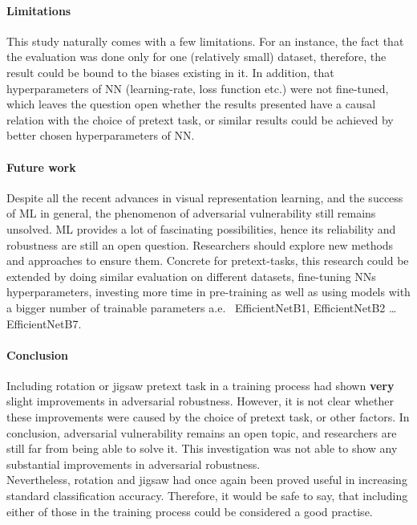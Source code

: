 \paragraph{Limitations}This study naturally comes with a few limitations.
For an instance, the fact that the evaluation was done only for one (relatively small) dataset,
therefore, the result could be bound to the biases existing in it.
In addition, that hyperparameters of NN (learning-rate, loss function etc.)
were not fine-tuned, which leaves the question open whether the
results presented have a causal relation with the choice of pretext task,
or similar results could be achieved by better chosen hyperparameters of NN.

\paragraph{Future work}
Despite all the recent advances in visual representation learning, and the success of ML in general, the phenomenon of
adversarial vulnerability still remains unsolved.
ML provides a lot of fascinating possibilities, hence its reliability and robustness are still an open question.
Researchers should explore new methods and approaches to ensure them.
Concrete for pretext-tasks, this research could be extended by doing similar evaluation on different datasets,
fine-tuning NNs hyperparameters,
investing more time in pre-training as well as using models with a bigger number of trainable parameters
a.e. \ EfficientNetB1, EfficientNetB2 \ldots EfficientNetB7.

\paragraph{Conclusion}
Including rotation or jigsaw pretext task in a training process had shown \textbf{very} slight improvements in adversarial robustness.
However, it is not clear whether these improvements were caused by the choice of pretext task, or other factors.
In conclusion, adversarial vulnerability remains an open topic,
and researchers are still far from being able to solve it.
This investigation was not able to show any substantial improvements in adversarial robustness.
\\
Nevertheless, rotation and jigsaw had once again been proved useful in increasing standard classification accuracy.
Therefore, it would be safe to say,
that including either of those in the training process could be considered a good practise.


